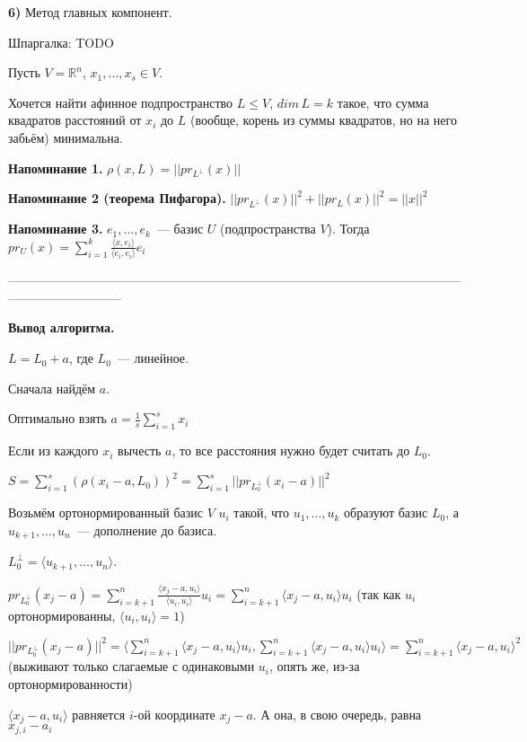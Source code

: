 {\bf 6)} Метод главных компонент.

Шпаргалка: TODO

Пусть $V = \mathbb{R}^n$, $x_1,\ldots, x_s \in V$.

Хочется найти афинное подпространство $L\le V$, $dim\,L = k$ такое, что сумма квадратов расстояний от $x_i$ до $L$ (вообще, корень из суммы квадратов, но на него забьём) минимальна.

{\bf Напоминание 1.} $\rho(x, L) = ||pr_{L^{\perp}}(x)||$

{\bf Напоминание 2 (теорема Пифагора).} $||pr_{L^{\perp}}(x)||^2 + ||pr_L(x)||^2 = ||x||^2$

{\bf Напоминание 3.} $e_1,\ldots,e_k$~--- базис $U$ (подпространства $V$). Тогда $pr_U(x)=\sum\limits_{i=1}^k\frac{\langle x, e_i\rangle}{\langle e_i, e_i\rangle}e_i$

---------------------------------------------------------------------------------------------------------------------------------------

{\bf Вывод алгоритма.}

$L = L_0 + a$, где $L_0$~--- линейное. 

Сначала найдём $a$.

\thrm Оптимально взять $a=\frac{1}{s}\sum\limits_{i=1}^s x_i$

\proof

Если из каждого $x_i$ вычесть $a$, то все расстояния нужно будет считать до $L_0$.

$S = \sum\limits_{i = 1}^s (\rho(x_i-a, L_0))^2 = \sum\limits_{i = 1}^s ||pr_{L_0^{\perp}}(x_i-a)||^2$

Возьмём ортонормированный базис $V$ $u_i$ такой, что $u_1,\ldots, u_k$ образуют базис $L_0$, а $u_{k+1},\ldots,u_n$~--- дополнение до базиса.

$L_0^\perp = \langle u_{k+1},\ldots,u_n\rangle$. 

$pr_{L_0^{\perp}}(x_j-a) = \sum\limits_{i = k + 1}^n \frac{\langle x_j - a, u_i\rangle}{\langle u_i, u_i\rangle}u_i = \sum\limits_{i = k + 1}^n \langle x_j - a, u_i\rangle u_i$ (так как $u_i$ ортонормированны, $\langle u_i, u_i\rangle = 1$)

$||pr_{L_0^{\perp}}(x_j-a)||^2 = \langle\sum\limits_{i = k + 1}^n \langle x_j - a, u_i\rangle u_i, \sum\limits_{i = k + 1}^n \langle x_j - a, u_i\rangle u_i\rangle = \sum\limits_{i = k + 1}^n \langle x_j - a, u_i\rangle^2$ (выживают только слагаемые с одинаковыми $u_i$, опять же, из-за ортонормированности)

$\langle x_j - a, u_i\rangle$ равняется $i$-ой координате $x_j - a$. А она, в свою очередь, равна $x_{j, i} - a_i$


